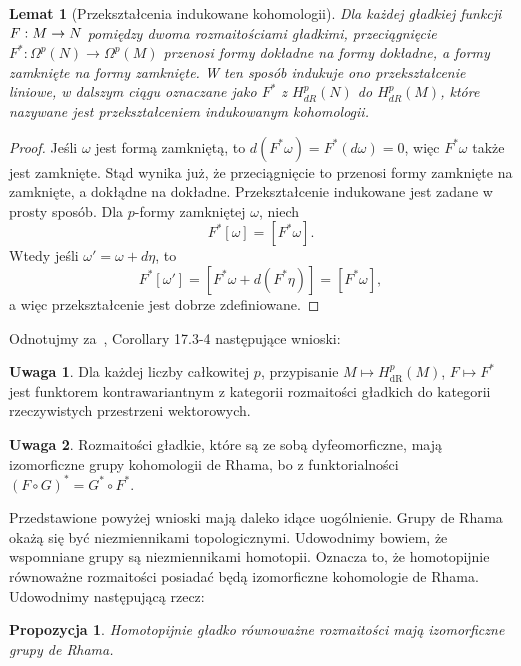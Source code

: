 \documentclass[licencjacka]{pracamgr}
\theoremstyle{definition}
\theoremstyle{definition}
\newtheorem{remark}{Uwaga}[section]
\theoremstyle{plain}
\newtheorem{lemma}{Lemat}[section]
\theoremstyle{plain}
\newtheorem{proposition}{Propozycja}[section]
\theoremstyle{plain}
\theoremstyle{plain}
\def\M{\ensuremath M}
\begin{document}
\begin{lemma}[Przekształcenia indukowane kohomologii]
  Dla każdej gładkiej funkcji {$F: \M \rightarrow N$} pomiędzy dwoma
  rozmaitościami gładkimi, przeciągnięcie $F^\ast: \Omega^p(N) \rightarrow
  \Omega^p (M)$ przenosi formy dokładne na formy dokładne, a formy zamknięte na
  formy zamknięte. W ten sposób indukuje ono przekształcenie liniowe, w dalszym
  ciągu oznaczane jako $F^\ast$ z $H^p_{dR} (N)$ do $H^p_{dR} (M)$, które
  nazywane jest przekształceniem indukowanym kohomologii. \\
\end{lemma}
\begin{proof}
  Jeśli $\omega$ jest formą zamkniętą, to $d(F^\ast \omega) = F^\ast(d \omega) = 0$,
  więc $F^\ast \omega$ także jest zamknięte. Stąd wynika już, że przeciągnięcie
  to przenosi formy zamknięte na zamknięte, a dokłądne na dokładne. Przekształcenie
  indukowane jest zadane w prosty sposób. Dla $p$-formy zamkniętej $\omega$, niech
  \[
  F^\ast[\omega] = [F^\ast\omega].
  \]
  Wtedy jeśli $\omega' = \omega + d \eta$, to 
  \[
  F^\ast[\omega'] = [F^\ast\omega + d(F^\ast\eta)] = [F^\ast\omega],
  \]
  a więc przekształcenie jest dobrze zdefiniowane.
\end{proof} 
Odnotujmy za~\cite{lee}, Corollary 17.3-4 następujące wnioski:
\begin{remark}
Dla każdej liczby całkowitej $p$, przypisanie $M \mapsto H_{\text{dR}}^p(M)$,
$F \mapsto F^\ast$ jest funktorem kontrawariantnym z kategorii
rozmaitości gładkich do kategorii rzeczywistych przestrzeni wektorowych.
\end{remark}
\begin{remark}
  Rozmaitości gładkie, które są ze sobą dyfeomorficzne, mają izomorficzne grupy
  kohomologii de Rhama, bo z funktorialności
  $(F \circ G)^\ast = G^\ast \circ F^\ast$.
\end{remark}


Przedstawione powyżej wnioski mają daleko idące uogólnienie. Grupy de Rhama
okażą się być niezmiennikami topologicznymi.  Udowodnimy bowiem, że wspomniane
grupy są niezmiennikami homotopii.  Oznacza to, że homotopijnie równoważne
rozmaitości posiadać będą izomorficzne kohomologie de Rhama. Udowodnimy
następującą rzecz:

\begin{proposition}\label{homotopy-de-Rham}
    Homotopijnie gładko równoważne rozmaitości mają izomorficzne grupy de Rhama.
\end{proposition}
\end{document}
